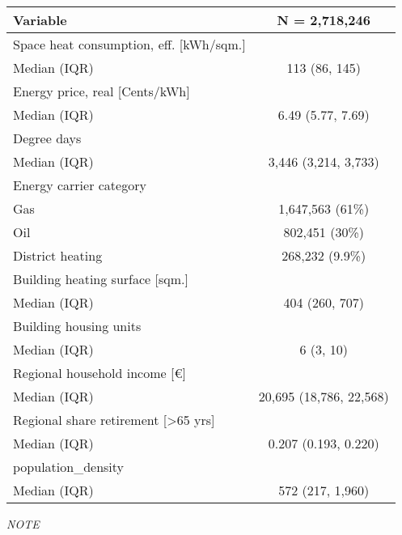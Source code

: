 \captionsetup[table]{labelformat=empty,skip=1pt}
\begin{longtable}{lc}
\toprule
\textbf{Variable} & \textbf{N = 2,718,246} \\ 
\midrule
Space heat consumption, eff. [kWh/sqm.] &  \\ 
Median (IQR) & 113 (86, 145) \\ 
Energy price, real [Cents/kWh] &  \\ 
Median (IQR) & 6.49 (5.77, 7.69) \\ 
Degree days &  \\ 
Median (IQR) & 3,446 (3,214, 3,733) \\ 
Energy carrier category &  \\ 
Gas & 1,647,563 (61\%) \\ 
Oil & 802,451 (30\%) \\ 
District heating & 268,232 (9.9\%) \\ 
Building heating surface [sqm.] &  \\ 
Median (IQR) & 404 (260, 707) \\ 
Building housing units &  \\ 
Median (IQR) & 6 (3, 10) \\ 
Regional household income [€] &  \\ 
Median (IQR) & 20,695 (18,786, 22,568) \\ 
Regional share retirement [>65 yrs] &  \\ 
Median (IQR) & 0.207 (0.193, 0.220) \\ 
population\_density &  \\ 
Median (IQR) & 572 (217, 1,960) \\ 
 \bottomrule
\end{longtable}
\begin{minipage}{\linewidth}
\emph{NOTE}\\ 
\end{minipage}

